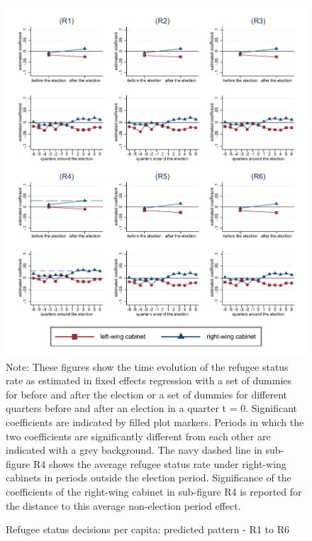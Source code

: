 \documentclass[11pt,a4paper]{scrartcl}
\begin{document}
\clearpage
\FloatBarrier
\begin{figure}[!ht]
	\caption{Refugee status decisions per capita: predicted pattern - R1 to R6}
	\includegraphics[width=1\textwidth]{../results/decisions/refugeestatus_rate_graphs_R1-R6.pdf}
	\scriptsize{Note: These figures show the time evolution of the refugee status rate as estimated in fixed effects regression with a set of dummies for before and after the election or a set of dummies for different quarters before and after an election in a quarter t = 0. Significant coefficients are indicated by filled plot markers. Periods in which the two coefficients are significantly different from each other are indicated with a grey background. The navy dashed line in sub-figure R4 shows the average refugee status rate under right-wing cabinets in periods outside the election period. Significance of the coefficients of the right-wing cabinet in sub-figure R4 is reported for the distance to this average non-election period effect.}
\end{figure}

\clearpage
\FloatBarrier


\end{document}
